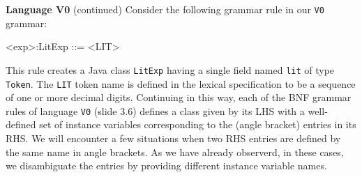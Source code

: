 \begin{minipage}[t]{\sw}
\slidenumber
\LARGE
{\bf Language V0} (continued)\exx
Consider the following grammar rule in our \verb'V0' grammar:
\begin{qv}
<exp>:LitExp ::= <LIT>
\end{qv}
This rule creates a Java class \verb'LitExp'
having a single field named \verb'lit' of type \verb'Token'.
The \verb'LIT' token name is defined in the lexical specification
to be a sequence of one or more decimal digits.\exx
Continuing in this way,
each of the BNF grammar rules of language \verb'V0' (slide 3.6)
defines a class given by its LHS
with a well-defined set of instance variables
corresponding to the (angle bracket) entries in its RHS.\exx
We will encounter a few situations
when two RHS entries are defined by the same name in angle brackets.
As we have already observerd,
in these cases, we disambiguate the entries
by providing different instance variable names.
\end{minipage}
